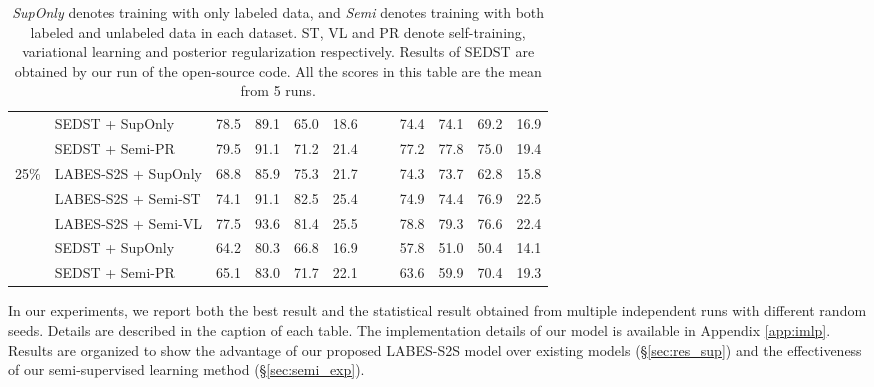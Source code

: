 \documentclass[11pt,a4paper]{article}
\newcommand{\modelname}{LABES}
\begin{document}
\begin{table*}[t]
{\begin{tabular}{c l  cccc c cccc}
				& SEDST + SupOnly                            & 78.5          & 89.1          & 65.0          & 18.6          &~~& 74.4          & 74.1          & 69.2          & 16.9          \\ 
& SEDST + Semi-PR                          & {79.5}          & {91.1}          & {71.2}          & {21.4}          &~~& {77.2}          & {77.8}          & {75.0}          & {19.4}          \\ 
				\midrule \multirow{5}{*}{25\%} & \modelname{}-S2S + SupOnly                          & 68.8          & 85.9          & 75.3          & 21.7          &~~& 74.3          & 73.7          & 62.8          & 15.8          \\ 
				& \modelname{}-S2S + Semi-ST                              & 74.1          & 91.1          & {82.5} & 25.4          &~~& 74.9          & 74.4          & {76.9} & {22.5} \\ 
				& \modelname{}-S2S + Semi-VL                               & {77.5} & {93.6} & 81.4          & {25.5} &~~& {78.8} & {79.3} & 76.6          & 22.4          \\ 
				\cmidrule{2-11}
				& SEDST + SupOnly                            & 64.2          & 80.3          & 66.8          & 16.9          &~~& 57.8          & 51.0          & 50.4          & 14.1          \\ 
& SEDST + Semi-PR                        & {65.1}         & {83.0}          & {71.7}          & {22.1}          &~~& {63.6}          & {59.9}          & {70.4}          & {19.3}          \\ 
				\bottomrule \end{tabular}}
		\caption{\textit{SupOnly} denotes training with only labeled data, and \textit{Semi} denotes training with both labeled and unlabeled data in each dataset. ST, VL and PR denote self-training, variational learning and posterior regularization \cite{sedst} respectively. Results of SEDST are obtained by our run of the open-source code. All the scores in this table are the mean from 5 runs. }
\label{semi_small} 
	\end{table*}
	
	In our experiments, we report both the best result and the statistical result obtained from multiple independent runs with different random seeds. Details are described in the caption of each table. The implementation details of our model is available in Appendix \ref{app:imlp}. Results are organized to show the advantage of our proposed \modelname{}-S2S model over existing models (\S\ref{sec:res_sup}) and the effectiveness of our semi-supervised learning method (\S\ref{sec:semi_exp}). 
	
\end{document}
